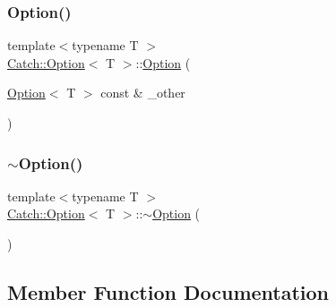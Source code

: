 \mbox{\label{class_catch_1_1_option_af02f2e4559f06384baec0def8c68c5fd}} 
\subsubsection{\texorpdfstring{Option()}{Option()}\hspace{0.1cm}{\footnotesize\ttfamily [3/3]}}
{\footnotesize\ttfamily template$<$typename T $>$ \\
\mbox{\hyperlink{class_catch_1_1_option}{Catch\+::\+Option}}$<$ T $>$\+::\mbox{\hyperlink{class_catch_1_1_option}{Option}} (\begin{DoxyParamCaption}\item[{\mbox{\hyperlink{class_catch_1_1_option}{Option}}$<$ T $>$ const \&}]{\+\_\+other }\end{DoxyParamCaption})\hspace{0.3cm}{\ttfamily [inline]}}

\mbox{\label{class_catch_1_1_option_a37fe90bb47bb909f150a5ad6be25581a}} 
\subsubsection{\texorpdfstring{$\sim$\+Option()}{~Option()}}
{\footnotesize\ttfamily template$<$typename T $>$ \\
\mbox{\hyperlink{class_catch_1_1_option}{Catch\+::\+Option}}$<$ T $>$\+::$\sim$\mbox{\hyperlink{class_catch_1_1_option}{Option}} (\begin{DoxyParamCaption}{ }\end{DoxyParamCaption})\hspace{0.3cm}{\ttfamily [inline]}}



\subsection{Member Function Documentation}
\mbox{\label{class_catch_1_1_option_a821753afdc3fac947a13a01fbe0d248e}} 
